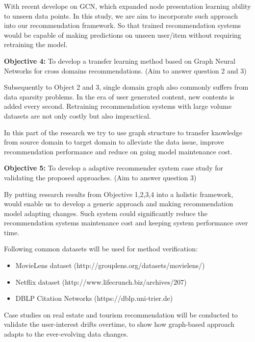 With recent develope on GCN, which expanded node presentation learning ability to unseen data points. In this study, we are aim to incorporate such approach into our recommendation framework. So that trained recommendation systems would be capable of making predictions on unseen user/item without requiring retraining the model.

\bigskip
\textbf{Objective 4:} To develop a transfer learning method based on Graph Neural Networks for cross domains recommendations. (Aim to answer question 2 and 3)

Subsequently to Object 2 and 3, single domain graph also commonly suffers from data sparsity problems. In the era of user generated content, new contents is added every second. Retraining recommendation systems with large volume datasets are not only costly but also impractical.

In this part of the research we try to use graph structure to transfer knowledge from source domain to target domain to alleviate the data issue, improve recommendation performance and reduce on going model maintenance cost.

\bigskip
\textbf{Objective 5:} To develop a adaptive recommender system case study for validating the proposed approaches. (Aim to answer question 3)

By putting research results from Objective 1,2,3,4 into a holistic framework, would enable us to develop a generic approach and making recommendation model adapting changes. Such system could significantly reduce the recommendation systems maintenance cost and keeping system performance over time. 

Following common datasets will be used for method verification: 

\begin{itemize}

\item MovieLens dataset (http://grouplens.org/datasets/movielens/) 

\item Netflix dataset (http://www.lifecrunch.biz/archives/207) 

\item DBLP Citation Networks (https://dblp.uni-trier.de)  

\end{itemize}

Case studies on real estate and tourism recommendation will be conducted to validate the user-interest drifts overtime, to show how graph-based approach adapts to the ever-evolving data changes. 
